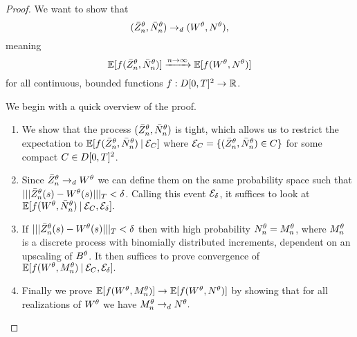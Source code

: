 \begin{proof}



We want to show that
\begin{equation}
(\bar{Z}^{\theta}_n, \bar{N}_n^{\theta}) \rightarrow_d (W^{\theta}, N^{\theta}),
\end{equation}
meaning 
\begin{equation}
\mathbb{E}[f(\bar{Z}^{\theta}_n, \bar{N}_n^{\theta})] \xrightarrow{n \rightarrow \infty} \mathbb{E}[f(W^{\theta}, N^{\theta})]
\end{equation}
for all continuous, bounded functions $f:D[0,T]^2\rightarrow\mathbb{R}$.

We begin with a quick overview of the proof.
\begin{enumerate}
	\item We show that the process $(\bar{Z}^{\theta}_n, \bar{N}_n^{\theta})$ is tight,
	which allows us to restrict the expectation to
	\begin{math}
		\mathbb{E}[f(\bar{Z}^{\theta}_n, \bar{N}_n^{\theta}) \: | \: \mathcal{E}_{C}]
	\end{math}
	where
	\begin{math}
		\mathcal{E}_{C} = \{ (\bar{Z}^{\theta}_n, \bar{N}_n^{\theta}) \in C \}
	\end{math}
	for some compact $C \in D[0, T]^2$.
	
	\item Since $\bar{Z}^{\theta}_n \rightarrow_d W^{\theta}$ we can define them on the same probability space such that
	$|||\bar{Z}^{\theta}_n(s) - W^{\theta}(s)|||_T < \delta$. 
	Calling this event $\mathcal{E}_{\delta}$,
	it suffices to look at
	\begin{math}
	\mathbb{E}[f(W^{\theta}, \bar{N}_n^{\theta}) \: | \: \mathcal{E}_{C}, \mathcal{E}_{\delta}].
	\end{math}
	
	\item If $|||\bar{Z}^{\theta}_n(s) - W^{\theta}(s)|||_T < \delta$ then with high probability $N_n^{\theta} = M_n^{\theta}$,
	where $M_n^{\theta}$ is a discrete process with binomially distributed increments,
	dependent on an upscaling of $B^{\theta}$.
	It then suffices to prove convergence of 
	\begin{math}
		\mathbb{E}[f(W^{\theta}, M_n^{\theta}) \: | \: \mathcal{E}_{C}, \mathcal{E}_{\delta}].
	\end{math}	
	
	\item Finally we prove
	\begin{math}
		\mathbb{E}[f(W^{\theta}, M_n^{\theta})] \rightarrow \mathbb{E}[f(W^{\theta}, N^{\theta})]
	\end{math}
	by showing that for all realizations of $W^{\theta}$ we have
	\begin{math}
		M_n^{\theta} \rightarrow_d N^{\theta}.
	\end{math}
\end{enumerate}



\end{proof}
